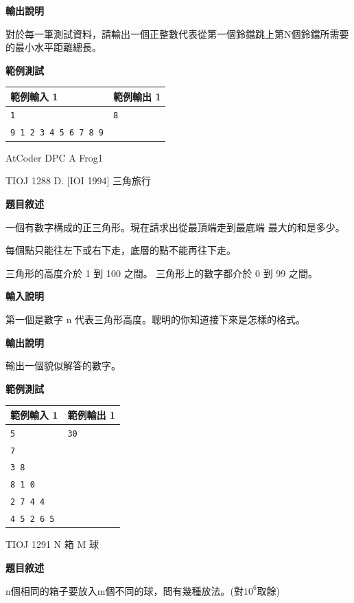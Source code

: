     \textbf{輸出說明}

    對於每一筆測試資料，請輸出一個正整數代表從第一個鈴鐺跳上第N個鈴鐺所需要的最小水平距離總長。

    \textbf{範例測試}

    \begin{tabular}{|m{7cm}|m{7cm}|}
        \hline
        範例輸入 1 & 範例輸出 1 \\
        \hline
        \verb|1| & \verb|8| \\
        \verb|9 1 2 3 4 5 6 7 8 9| & \\
        \hline
    \end{tabular}

    \begin{tip}
        AtCoder DPC A Frog1
    \end{tip}

    \problem TIOJ 1288 D. [IOI 1994] 三角旅行

    \textbf{題目敘述}

    一個有數字構成的正三角形。現在請求出從最頂端走到最底端 最大的和是多少。

    每個點只能往左下或右下走，底層的點不能再往下走。

    三角形的高度介於 1 到 100 之間。
    三角形上的數字都介於 0 到 99 之間。

    \textbf{輸入說明}

    第一個是數字 n 代表三角形高度。聰明的你知道接下來是怎樣的格式。

    \textbf{輸出說明}

    輸出一個貌似解答的數字。

    \textbf{範例測試}

    \begin{tabular}{|m{7cm}|m{7cm}|}
        \hline
        範例輸入 1 & 範例輸出 1 \\
        \hline
        \verb|5| & \verb|30| \\
        \verb|7| & \\
        \verb|3 8| & \\
        \verb|8 1 0| & \\
        \verb|2 7 4 4| & \\
        \verb|4 5 2 6 5| & \\
        \hline
    \end{tabular}

    \problem TIOJ 1291 N 箱 M 球

    \textbf{題目敘述}

    n個相同的箱子要放入m個不同的球，問有幾種放法。(對$10^6$取餘)

